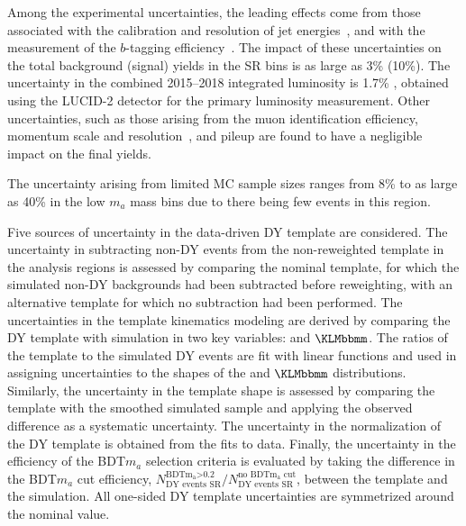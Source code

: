 \documentclass[cernpreprint, backref=false, texlive=2020, UKenglish, dvipsnames, block=none, texmf]{atlasdoc}
\begin{document}
 
 
Among the experimental uncertainties, the leading effects come from those associated with the
calibration and resolution of jet energies~\cite{PERF-2016-04}, and with the measurement of the $b$-tagging efficiency~\cite{FTAG-2018-01}. The impact of these uncertainties on the total background (signal) yields in the SR bins is as large as 3\% (10\%).
The uncertainty in the combined 2015--2018 integrated luminosity is 1.7\% \cite{ATLAS-CONF-2019-021}, obtained using the LUCID-2 detector \cite{LUCID2} for the primary luminosity measurement.
Other uncertainties, such as those arising from the muon identification efficiency, momentum scale and resolution~\cite{PERF-2015-10,MUON-2018-0333}, and pileup are found to have a negligible impact on the final yields.
 
The uncertainty arising from limited MC sample sizes ranges from 8\% to as large as 40\% in the low $m_a$ mass bins due to there being few \ttbar events in this region.
 
 
Five sources of uncertainty in the data-driven DY template are considered. The uncertainty in subtracting non-DY events from the non-reweighted template in the analysis regions is assessed by comparing the nominal template, for which the simulated non-DY backgrounds had been subtracted before reweighting, with an alternative template for which no subtraction had been performed.
The uncertainties in the template kinematics modeling
are derived by comparing the DY template with simulation in two key variables: \met and $\KLMbbmm$.
The ratios of the template to the simulated DY events are fit with linear functions and used in assigning uncertainties to the shapes of the \met and $\KLMbbmm$ distributions.
Similarly, the uncertainty in the  \Mmm template shape is assessed by comparing the template with the smoothed simulated sample and applying the observed difference  as a systematic uncertainty. 
The uncertainty in the normalization of the DY template is obtained from the fits to data.
Finally, the uncertainty in the efficiency of the BDT$m_a$ selection criteria is evaluated by taking the difference in the BDT$m_a$ cut efficiency, $N_{\text{DY events SR}}^{\text{BDTm}\mathrm{_a}\text{>0.2}}/N_{\text{DY events SR}}^{\text{no BDTm}\mathrm{_a} \text{ cut}}$, between the template and the simulation.  All one-sided DY template uncertainties are symmetrized around the nominal value.
 
\end{document}
